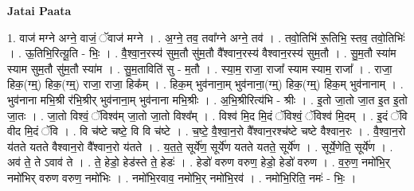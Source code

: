 \documentclass[17pt]{extarticle}
\begin{document}
\textbf{Jatai Paata} \newline

1. वाज॑ मग्ने अग्ने॒ वाजं॒ ॅवाज॑ मग्ने । . अ॒ग्ने॒ तव॒ तवा᳚ग्ने अग्ने॒ तव॑ । . तवो॒तिभि॑ रू॒तिभि॒ स्तव॒ तवो॒तिभिः॑ । . ऊ॒तिभि॒रित्यू॒ति - भिः॒ । . वै॒श्वा॒न॒रस्य॑ सुम॒तौ सु॑म॒तौ वै᳚श्वान॒रस्य॑ वैश्वान॒रस्य॑ सुम॒तौ । . सु॒म॒तौ स्या॑म स्याम सुम॒तौ सु॑म॒तौ स्या॑म । . सु॒म॒ताविति॑ सु - म॒तौ । . स्या॒म॒ राजा॒ राजा᳚ स्याम स्याम॒ राजा᳚ । . राजा॒ हिक॒(ग्म्॒) हिक॒(ग्म्॒) राजा॒ राजा॒ हिक᳚म् । . हिक॒म् भुव॑नाना॒म् भुव॑नाना॒(ग्म्॒) हिक॒(ग्म्॒) हिक॒म् भुव॑नानाम् । . भुव॑नाना मभि॒श्री र॑भि॒श्रीर् भुव॑नाना॒म् भुव॑नाना मभि॒श्रीः । . अ॒भि॒श्रीरित्य॑भि - श्रीः । . इ॒तो जा॒तो जा॒त इ॒त इ॒तो जा॒तः । . जा॒तो विश्वं॒ ॅविश्व॑म् जा॒तो जा॒तो विश्व᳚म् । . विश्व॑ मि॒द मि॒दं ॅविश्वं॒ ॅविश्व॑ मि॒दम् । . इ॒दं ॅवि वीद मि॒दं ॅवि । . वि च॑ष्टे चष्टे॒ वि वि च॑ष्टे । . च॒ष्टे॒ वै॒श्वा॒न॒रो वै᳚श्वान॒रश्च॑ष्टे चष्टे वैश्वान॒रः । . वै॒श्वा॒न॒रो य॑तते यतते वैश्वान॒रो वै᳚श्वान॒रो य॑तते । . य॒त॒ते॒ सूर्ये॑ण॒ सूर्ये॑ण यतते यतते॒ सूर्ये॑ण । . सूर्ये॒णेति॒ सूर्ये॑ण । . अव॑ ते॒ ते ऽवाव॑ ते । . ते॒ हेडो॒ हेड॑स्ते ते॒ हेडः॑ । . हेडो॑ वरुण वरुण॒ हेडो॒ हेडो॑ वरुण । . व॒रु॒ण॒ नमो॑भि॒र् नमो॑भिर् वरुण वरुण॒ नमो॑भिः । . नमो॑भि॒रवाव॒ नमो॑भि॒र् नमो॑भि॒रव॑ । . नमो॑भि॒रिति॒ नमः॑ - भिः॒ । \newline
\end{document}
